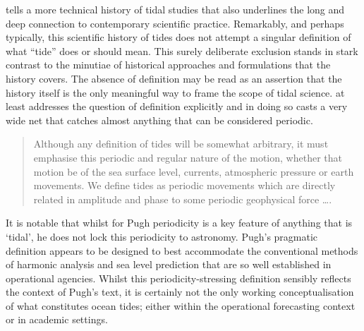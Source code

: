 \citet{Cartwright:2000tt} tells a more technical history of tidal studies that also underlines the long and deep connection to contemporary scientific practice. Remarkably, and perhaps typically, this scientific history of tides does not attempt a singular definition of what ``tide'' does or should mean.  This surely deliberate exclusion stands in stark contrast to the minutiae of historical approaches and formulations that the history covers.  The absence of definition may be read as an assertion that the history itself is the only meaningful way to frame the scope of tidal science.
\citet{Pugh:1996uz} at least addresses the question of definition explicitly and in doing so casts a very wide net that catches almost anything that can be considered periodic.
\begin{quote}
Although any definition of tides will be somewhat arbitrary, it must emphasise this periodic and regular nature of the motion, whether that motion be of the sea surface level, currents, atmospheric pressure or earth movements. We define tides as periodic movements which are directly related in amplitude and phase to some periodic geophysical force \ldots.
\end{quote}
It is notable that whilst for Pugh periodicity is a key feature of anything that is `tidal', he does not lock this periodicity to astronomy.  Pugh's pragmatic definition appears to be designed to best accommodate the conventional methods of harmonic analysis and sea level prediction that are so well established in operational agencies. Whilst this periodicity-stressing definition sensibly reflects the context of Pugh's text, it is certainly not the only working conceptualisation of what constitutes ocean tides; either within the operational forecasting context or in academic settings. 

